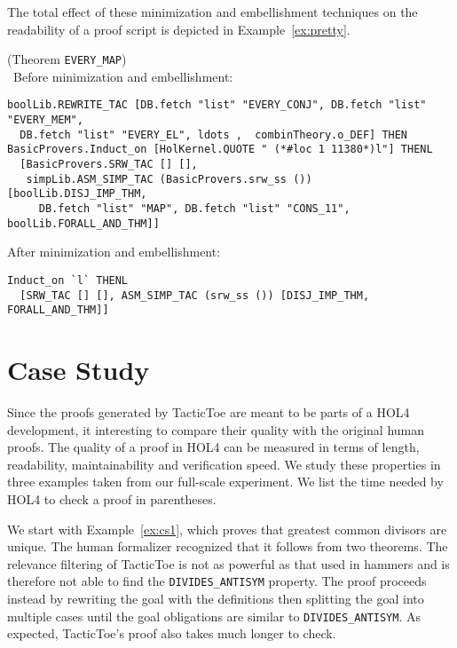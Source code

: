 \documentclass[runningheads,a4paper,draft]{svjour3}
\def\holfour{\textsf{HOL4}\xspace}
\def\tactictoe{\textsf{TacticToe}\xspace}
\begin{document}
The total effect of these minimization and embellishment techniques
on the readability of a proof script is depicted in
Example~\ref{ex:pretty}.

\begin{example}(Theorem \texttt{EVERY\_MAP})\label{ex:pretty}\\\
Before minimization and embellishment:
\begin{lstlisting}[language=SMLSmall]
boolLib.REWRITE_TAC [DB.fetch "list" "EVERY_CONJ", DB.fetch "list" "EVERY_MEM",
  DB.fetch "list" "EVERY_EL", ldots ,  combinTheory.o_DEF] THEN
BasicProvers.Induct_on [HolKernel.QUOTE " (*#loc 1 11380*)l"] THENL
  [BasicProvers.SRW_TAC [] [],
   simpLib.ASM_SIMP_TAC (BasicProvers.srw_ss ()) [boolLib.DISJ_IMP_THM,
     DB.fetch "list" "MAP", DB.fetch "list" "CONS_11", boolLib.FORALL_AND_THM]]

\end{lstlisting}
After minimization and embellishment:
\begin{lstlisting}[language=SMLSmall]
Induct_on `l` THENL
  [SRW_TAC [] [], ASM_SIMP_TAC (srw_ss ()) [DISJ_IMP_THM, FORALL_AND_THM]]
\end{lstlisting}
\end{example}

\section{Case Study}\label{sec:case_study}
Since the proofs generated by \tactictoe are meant to be parts of a \holfour development, it interesting to compare their quality with the original human proofs.
The quality of a proof in \holfour can be measured in terms of length, readability, maintainability and verification speed.
We study these properties in three examples taken from our full-scale experiment.
We list the time needed by \holfour to check a proof in parentheses.

We start with Example~\ref{ex:cs1}, which proves that greatest common divisors are unique.
The human formalizer recognized that it follows from two theorems.
The relevance filtering of \tactictoe is not as powerful as that used in hammers
and is therefore not able to find the \texttt{DIVIDES\_ANTISYM} property. The proof
proceeds instead by rewriting the
goal with the definitions then splitting the goal into multiple cases until the goal obligations are similar
to \texttt{DIVIDES\_ANTISYM}. As expected, \tactictoe's proof
also takes much longer to check.
\end{document}
